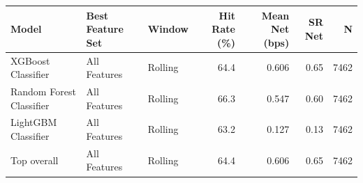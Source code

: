 \begin{tabular}{lllrrrr}
\toprule
Model & Best Feature Set & Window & Hit Rate (\%) & Mean Net (bps) & SR Net & N \\
\midrule
XGBoost Classifier & All Features & Rolling & 64.4 & 0.606 & 0.65 & 7462 \\
Random Forest Classifier & All Features & Rolling & 66.3 & 0.547 & 0.60 & 7462 \\
LightGBM Classifier & All Features & Rolling & 63.2 & 0.127 & 0.13 & 7462 \\
\midrule
Top overall & All Features & Rolling & 64.4 & 0.606 & 0.65 & 7462 \\
\bottomrule
\end{tabular}
